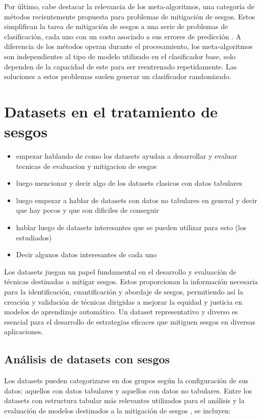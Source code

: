 Por \'ultimo, cabe destacar la relevancia de los meta-algoritmos, una categor\'ia de m\'etodos recientemente propuesta para problemas de 
mitigaci\'on de sesgos. Estos simplifican la tarea de mitigaci\'on de sesgos a una serie de problemas de clasificaci\'on, cada uno con 
un costo asociado a sus errores de predicci\'on \cite{agarwal2018reductions, agarwal2019fair}.
A diferencia de los m\'etodos operan durante el procesamiento, los meta-algoritmos son independientes al tipo de modelo utilizado en el 
clasificador base, solo dependen de la capacidad de este para ser reentrenado repetidamente. Las soluciones a estos problemas suelen generar
un clasificador randomizado.

\section{Datasets en el tratamiento de sesgos}
    \begin{itemize}
        \item empezar hablando de como los datasets ayudan a desarrollar y evaluar tecnicas de evaluacion y mitigacion de sesgos
        \item luego mencionar y decir algo de los datasets clasicos con datos tabulares
        \item luego empezar a hablar de datasets con datos no tabulares en general y decir que hay pocos y que son dificiles de conseguir 
        \item hablar luego de datasets interesantes que se pueden utilizar para esto (los estudiados)
        \item Decir algunos datos interesantes de cada uno
    \end{itemize}

    Los datasets juegan un papel fundamental en el desarrollo y evaluaci\'on de t\'ecnicas destinadas a mitigar sesgos. Estos proporcionan la 
    informaci\'on necesaria para la identificaci\'on, cuantificaci\'on y abordaje de sesgos, permitiendo as\'i 
    la creaci\'on y validaci\'on de t\'ecnicas dirigidas a mejorar la equidad y justicia en modelos de aprendizaje autom\'atico. 
    Un dataset representativo y diverso es esencial para el desarrollo de estrategias eficaces que mitiguen sesgos en diversas aplicaciones.
    
    \subsection{An\'alisis de datasets con sesgos}
    Los datasets pueden categorizarse en dos grupos seg\'un la configuraci\'on de sus datos: 
    aquellos con datos tabulares y aquellos con datos no tabulares. Entre los datasets con estructura
    tabular m\'as relevantes utilizados para el an\'alisis y la evaluaci\'on de modelos destinados 
    a la mitigaci\'on de sesgos \cite{calmon2017optimized,wang2023mitigating,compas}, se incluyen:

